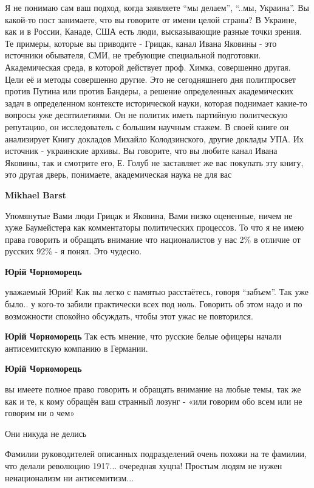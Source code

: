 \begin{itemize}
\begin{itemize}
Я не понимаю сам ваш подход, когда заявляете \enquote{мы делаем}, \enquote{..мы, Украина}. Вы
какой-то пост занимаете, что вы говорите от имени целой страны? В Украине, как
и в России, Канаде, США есть люди, высказывающие разные точки зрения. Те
примеры, которые вы приводите - Грицак, канал Ивана Яковины - это источники
обывателя, СМИ, не требующие специальной подготовки. Академическая среда, в
которой действует проф. Химка, совершенно другая. Цели её и методы совершенно
другие. Это не сегодняшнего дня политпросвет против Путина или против Бандеры,
а решение определенных академических задач в определенном контексте
исторической науки, которая поднимает какие-то вопросы уже десятилетиями. Он не
политик иметь партийную политческую репутацию, он исследователь с большим
научным стажем. В своей книге он анализирует Книгу докладов Михайло
Колодзинского, другие доклады УПА. Их источник - украинские архивы. Вы
говорите, что вы любите канал Ивана Яковины, так и смотрите его, Е. Голуб не
заставляет же вас покупать эту книгу, это другая дверь, понимаете,
академическая наука не для вас

\textbf{Mikhael Barst} 

Упомянутые Вами люди Грицак и Яковина, Вами низко оцененные, ничем не хуже
Баумейстера как комментаторы политических процессов. То что я не имею права
говорить и обращать внимание что националистов у нас 2\% в отличие от русских
92\% - я понял. Это чудесно.


\textbf{Юрій Чорноморець} 

уважаемый Юрий! Как вы легко с памятью расстаётесь, говоря \enquote{забъем}. Так уже
было.. у кого-то забили практически всех под ноль. Говорить об этом надо и по
возможности спокойно обсуждать, чтобы этот ужас не повторился.

\textbf{Юрій Чорноморець} Так есть мнение, что русские белые офицеры начали антисемитскую компанию в Германии.

\textbf{Юрій Чорноморець} 

вы имеете полное право говорить и обращать внимание на любые темы, так же как и
те, к кому обращён ваш странный лозунг - «или говорим обо всем или не говорим
ни о чем»

\end{itemize} %

Они никуда не делись


Фамилии руководителей описанных подразделений очень похожи на те фамилии, что
делали революцию 1917... очередная хуцпа! Простым людям не нужен ненационализм
ни антисемитизм...



\end{itemize}
